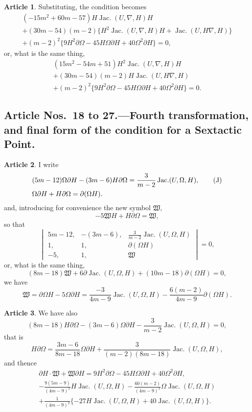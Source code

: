 \documentclass[11pt,a4paper]{article}
\theoremstyle{definition}
\newtheorem{art}{Article}[section]
\DeclareMathOperator{\Jac}{Jac.}
\newcommand{\fW}{\mathfrak{W}}
\begin{document}
\setcounter{art}{16}
\begin{art}
Substituting, the condition becomes
\begin{multline*}
(-15m^2 + 60m - 57) H \Jac(U, \nabla, H)H \\
+ (30m - 54)(m-2)\bigl\{H^2 \Jac(U, \nabla, H)H + \Jac(U, H\nabla, H)\bigr\} \\
+ (m-2)^2 \bigl\{9H^2 \partial \Omega - 45H\Omega \partial H + 40\Omega^2 \partial H\bigr\} = 0,
\end{multline*}
or, what is the same thing,
\begin{multline*}
(15m^2 - 54m + 51) H^2 \Jac(U, \nabla, H)H \\
+ (30m - 54)(m-2)H \Jac(U, H\nabla, H) \\
+ (m-2)^2 \bigl\{9H^2 \partial \Omega - 45H\Omega \partial H + 40\Omega^2 \partial H\bigr\} = 0.
\end{multline*}
\end{art}

\subsection*{Article Nos.\ 18 to 27.---Fourth transformation, and final form of the
condition for a Sextactic Point.}

\setcounter{art}{17}
\begin{art}
I write
\begin{align}
&(5m - 12)\Omega \partial H - (3m - 6)H \partial \Omega = \frac{3}{m-2} \Jac(U, \Omega, H),
\tag{J} \\
&\Omega \partial H + H \partial \Omega = \partial(\Omega H). \notag
\end{align}
and, introducing for convenience the new symbol $\fW$,
\[
-5\fW H + H \partial \Omega = \fW,
\]
so that
\[
\begin{vmatrix}
5m-12, & -(3m-6), & \frac{3}{m-2}\Jac(U, \Omega, H) \\
1, & 1, & \partial(\Omega H) \\
-5, & 1, & \fW
\end{vmatrix}
= 0,
\]
or, what is the same thing,
\[
(8m - 18)\fW + 6\partial \Jac(U, \Omega, H) + (10m - 18)\partial(\Omega H) = 0,
\]
we have
\[
\fW = \partial \Omega H - 5\Omega \partial H
= \frac{-3}{4m-9}\Jac(U, \Omega, H) - \frac{6(m-2)}{4m-9}\partial(\Omega H).
\]
\end{art}

\begin{art}
We have also
\[
(8m-18)H \partial \Omega - (3m-6)\Omega \partial H - \frac{3}{m-2}\Jac(U, \Omega, H) = 0,
\tag{J}
\]
that is
\[
H \partial \Omega = \frac{3m-6}{8m-18}\Omega \partial H
+ \frac{3}{(m-2)(8m-18)}\Jac(U, \Omega, H),
\]
and thence
\begin{multline*}
\partial H \cdot \fW + \fW \partial H
= 9H^2 \partial \Omega - 45H\Omega \partial H + 40\Omega^2 \partial H, \\
- \frac{9(5m-9)}{(4m-9)^2} H \Jac(U, \Omega, H)
- \frac{60(m-2)}{(4m-9)^2} \Omega \Jac(U, \Omega, H) \\
+ \frac{1}{(4m-9)^2}\{-27H \Jac(U, \Omega, H) + 40\Jac(U, \Omega, H)\}.
\end{multline*}
\end{art}
\end{document}
